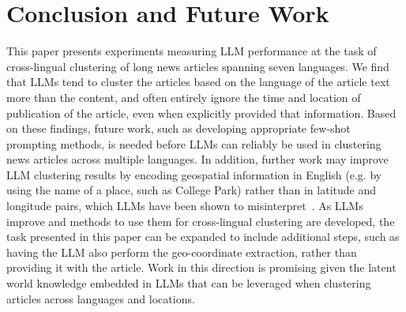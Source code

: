 \section{Conclusion and Future Work}\label{section:conclusion}

This paper presents experiments measuring LLM performance at the task of cross-lingual clustering of long news articles spanning seven languages.
We find that LLMs tend to cluster the articles based on the language of the article text more than the content, and often entirely ignore the time and location of publication of the article, even when explicitly provided that information.
Based on these findings, future work, such as developing appropriate few-shot prompting methods, is needed before LLMs can reliably be used in clustering news articles across multiple languages.
In addition, further work may improve LLM clustering results by encoding geospatial information in English (e.g. by using the name of a place, such as College Park) rather than in latitude and longitude pairs, which LLMs have been shown to misinterpret~\cite{manvi2024geollmextractinggeospatialknowledge}. 
As LLMs improve and methods to use them for cross-lingual clustering are developed, the task presented in this paper can be expanded to include additional steps, such as having the LLM also perform the geo-coordinate extraction, rather than providing it with the article.
Work in this direction is promising given the latent world knowledge embedded in LLMs that can be leveraged when clustering articles across languages and locations.

